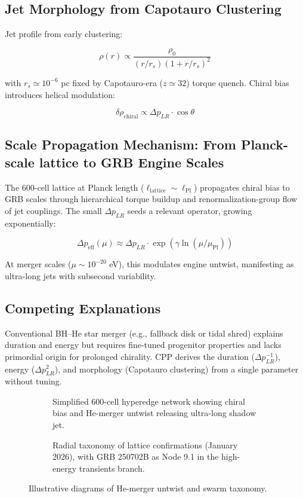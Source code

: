 \documentclass[11pt]{article}
\begin{document}
\subsection{Jet Morphology from Capotauro Clustering}
Jet profile from early clustering:

\[
\rho(r) \propto \frac{\rho_0}{(r/r_s)(1 + r/r_s)^2}
\]

with $r_s \simeq 10^{-6}$ pc fixed by Capotauro-era ($z \simeq 32$) torque quench. Chiral bias introduces helical modulation:

\[
\delta \rho_{\text{chiral}} \propto \Delta p_{LR} \cdot \cos\theta
\]

\subsection{Scale Propagation Mechanism: From Planck-scale lattice to GRB Engine Scales}
The 600-cell lattice at Planck length ($\ell_{\text{lattice}} \sim \ell_{\text{Pl}}$) propagates chiral bias to GRB scales through hierarchical torque buildup and renormalization-group flow of jet couplings. The small $\Delta p_{LR}$ seeds a relevant operator, growing exponentially:

\[
\Delta p_{\text{eff}}(\mu) \approx \Delta p_{LR} \cdot \exp(\gamma \ln(\mu / \mu_{\text{Pl}}))
\]

At merger scales ($\mu \sim 10^{-20}$ eV), this modulates engine untwist, manifesting as ultra-long jets with subsecond variability.

\subsection{Competing Explanations}
Conventional BH–He star merger (e.g., fallback disk or tidal shred) explains duration and energy but requires fine-tuned progenitor properties and lacks primordial origin for prolonged chirality. CPP derives the duration ($\Delta p_{LR}^{-1}$), energy ($\Delta p_{LR}^2$), and morphology (Capotauro clustering) from a single parameter without tuning.

\begin{figure}[htbp]
\centering
\begin{subfigure}{0.45\textwidth}
\centering
\caption{Simplified 600-cell hyperedge network showing chiral bias and He-merger untwist releasing ultra-long shadow jet.}
\label{fig:he-untwist}
\end{subfigure}
\hfill
\begin{subfigure}{0.45\textwidth}
\centering
\caption{Radial taxonomy of lattice confirmations (January 2026), with GRB 250702B as Node 9.1 in the high-energy transients branch.}
\label{fig:taxonomy}
\end{subfigure}
\caption{Illustrative diagrams of He-merger untwist and swarm taxonomy.}
\end{figure}
\end{document}
